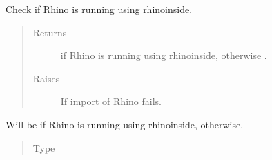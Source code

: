 \documentclass[letterpaper,10pt,english]{sphinxmanual}
\begin{document}
\begin{fulllineitems}
\label{\detokenize{cockatoo:cockatoo.environment.is_rhino_inside}}
Check if Rhino is running using rhinoinside.
\begin{quote}\begin{description}
\item[{Returns}] \leavevmode
{} \textendash{}  if Rhino is running using rhinoinside, otherwise .

\item[{Raises}] \leavevmode
{\hyperref[\detokenize{cockatoo:cockatoo.exception.RhinoNotPresentError}]{}} \textendash{} If import of Rhino fails.

\end{description}\end{quote}

\end{fulllineitems}


\begin{fulllineitems}
\label{\detokenize{cockatoo:cockatoo.environment.RHINOINSIDE}}
Will be  if Rhino is running using rhinoinside, 
otherwise.
\begin{quote}\begin{description}
\item[{Type}] \leavevmode
{}%
\begin{footnote}[47]\sphinxAtStartFootnote
{}
%
\end{footnote}

\end{description}\end{quote}

\end{fulllineitems}

\end{document}

